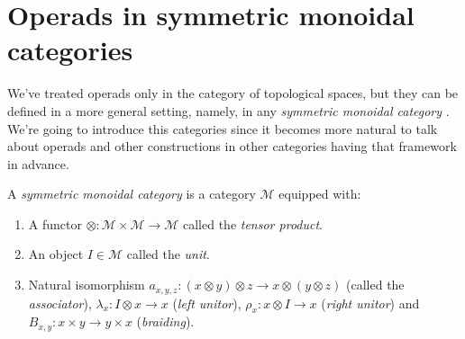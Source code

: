 \documentclass[TFM.tex]{subfiles}
\begin{document}

\section{Operads in symmetric monoidal categories}
We've treated operads only in the category of topological spaces, but they can be defined in a more general setting, namely, in any \emph{symmetric monoidal category} \cite{Yau}. We're going to introduce this categories since it becomes more natural to talk about operads and other constructions in other categories having that framework in advance.

\begin{defi}\label{monoidal}
A \emph{symmetric monoidal category} is a category $\mathscr{M}$ equipped with:
\begin{enumerate}[(1)]
\item A functor $\otimes: \mathscr{M}\times \mathscr{M}\to \mathscr{M}$ called the \emph{tensor product}.
\item An object $I\in \mathscr{M}$ called the \emph{unit}.
\item Natural isomorphism $a_{x,y,z} : (x \otimes y) \otimes z \to x \otimes (y \otimes z)$ (called the \emph{associator}), $\lambda_x : I \otimes x \to x$ (\emph{left unitor}), $\rho_x : x \otimes I \to x$ (\emph{right unitor}) and $B_{x,y}: x\times y\to y\times x$ (\emph{braiding}).
\end{enumerate}


\end{defi}
\end{document}
